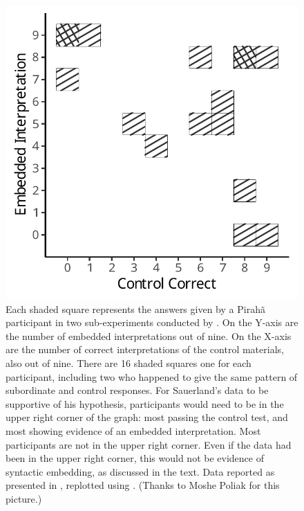 \documentclass{article}
\begin{document}
\begin{figure}
    \includegraphics[width=.9\textwidth]{gibson_figure1.pdf}
    \caption{Each shaded square represents the answers given by a Pirahã participant in two sub-experiments conducted by \cite{sauerland2018false}. On the Y-axis are the number of embedded interpretations out of nine. On the X-axis are the number of correct interpretations of the control materials, also out of nine. There are 16 shaded squares one for each participant, including two who happened to give the same pattern of subordinate and control responses.  \newline \newline For Sauerland's data to be supportive of his hypothesis, participants would need to be in the upper right corner of the graph:  most passing the control test, and most showing evidence of an embedded interpretation.  Most participants are not in the upper right corner. Even if the data had been in the upper right corner, this would not be evidence of syntactic embedding, as discussed in the text. \newline \newline
    Data reported as presented in \cite{sauerland2018false}, replotted using \cite{r2023, wickham2016, ggpattern2022}. (Thanks to Moshe Poliak for this picture.)}
    \label{fig:gibson:fig1}
\end{figure}
\end{document}
